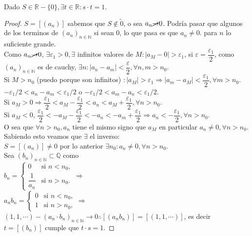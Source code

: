 \begin{theorem}
  Dado $S \in \mathbb{R} - \{0\}, \exists t \in \mathbb{R} : s \cdot t = 1$.
  \begin{proof}
    $S = [(a_n)]$ sabemos que $S \notin \tilde{0}$, o sea $a_n \cancel{\to} 0$. Podría pasar que algunos de los terminos de $(a_n)_{n \in \mathbb{N}}$ si sean $0$, lo que pasa es que $a_n \neq 0.$ para $n$ lo suficiente grande. \\
    Como $a_n \cancel{\to} 0$, $\exists \varepsilon_1 > 0, \exists$ infinitos valores de $M: |a_M - 0| > \varepsilon_1$, si $\varepsilon = \dfrac{\varepsilon_1}{2}$, como $(a_n)_{n \in \mathbb{N}}$ es de cauchy, $\exists n : |a_n - a_m| < \dfrac{\varepsilon}{2}, \forall n, m > n_0$. \\
    Si $M > n_0$ (puedo porque son infinitos) $: |a_M| > \varepsilon_1 \Rightarrow |a_m - a_M| < \dfrac{\varepsilon_1}{2}, \forall m > n_0$. \\
    $-\varepsilon_1/2 < a_n - a_m < \varepsilon_1 / 2$ o $-\varepsilon_1 / 2 < a_m - a_n < \varepsilon_1 / 2$. \\ 
    Si $a_M > 0 \Rightarrow \dfrac{\varepsilon_1}{2} < a_M - \dfrac{\varepsilon_1}{2} < a_n < a_M + \dfrac{\varepsilon_1}{2}, \forall n > n_0$. \\
    Si $a_M < 0$, $\dfrac{\varepsilon_1}{2} < -a_M - \dfrac{\varepsilon_1}{2} < -a_n<-a_m+ \dfrac{\varepsilon_1}{2} \Rightarrow a_n < -\dfrac{\varepsilon_1}{2}, \forall n > n_0$. \\
    O sea que $\forall n > n_0, a_n$ tiene el mismo signo que $a_M$ en particular $a_n \neq 0, \forall n > n_0$. \\
    Sabiendo esto veamos que $\exists$ el inverso: \\
    $S = [(a_n)] \neq 0$ por lo anterior $\exists n_0 : a_n \neq 0, \forall n > n_0$. \\
    Sea $(b_n)_{n \in \mathbb{N}} \subset \mathbb{Q}$ como \\
    $b_n = \begin{cases}
      0 & \text{si } n < n_0, \\ 
      \dfrac{1}{a_n} & \text{si } n > n_0.
    \end{cases} \Rightarrow$ \\

    $a_n b_n = \begin{cases}
      0 & \text{si } n < n_0, \\
      1 & \text{si } n > n_0,
    \end{cases} \Rightarrow$ \\

    $(1, 1, \cdots) - (a_n \cdot b_n)_{n \in \mathbb{N}} \to 0 \therefore [(a_n b_n)] = [(1, 1, \cdots)]$, es decir $t = [(b_n)]$ cumple que $t \cdot s = 1$.
  \end{proof}
\end{theorem}

